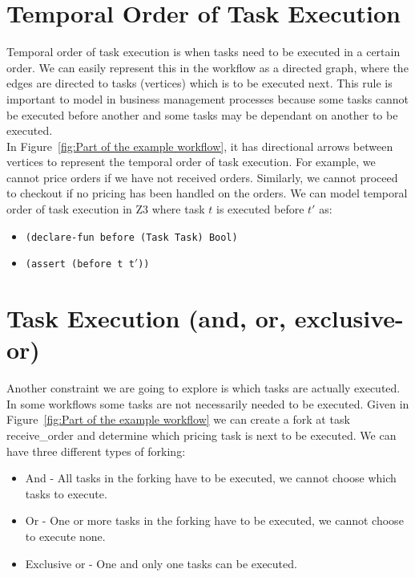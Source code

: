 \documentclass[a4paper]{report}
\begin{document}
\section{Temporal Order of Task Execution}
Temporal order of task execution is when tasks need to be executed in a certain order. We can easily represent this in the workflow as a directed graph, where the edges are directed to tasks (vertices) which is to be executed next. This rule is important to model in business management processes because some tasks cannot be executed before another and some tasks may be dependant on another to be executed. \\

In Figure~\ref{fig:Part of the example workflow}, it has directional arrows between vertices to represent the temporal order of task execution. For example, we cannot price orders if we have not received orders. Similarly, we cannot proceed to checkout if no pricing has been handled on the orders. We can model temporal order of task execution in Z3 where task $t$ is executed before $t\ensuremath{'}$ as:
\begin{itemize}
\item \texttt{(declare-fun before (Task Task) Bool)}
\item \texttt{(assert (before t t\ensuremath{'}))}
\end{itemize}

\section{Task Execution (and, or, exclusive-or)}
Another constraint we are going to explore is which tasks are actually executed. In some workflows some tasks are not necessarily needed to be executed. Given in Figure~\ref{fig:Part of the example workflow} we can create a fork at task receive\_order and determine which pricing task is next to be executed. We can have three different types of forking:
\begin{itemize}
\item And - All tasks in the forking have to be executed, we cannot choose which tasks to execute.
\item Or - One or more tasks in the forking have to be executed, we cannot choose to execute none.
\item Exclusive or - One and only one tasks can be executed.
\end{itemize}
\end{document}
